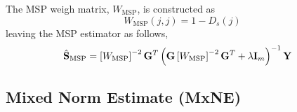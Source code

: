 The MSP weigh matrix, $W_\text{MSP}$, is constructed as
\begin{equation}
W_\text{MSP}(j,j) = 1-{D}_s(j)
\end{equation}
leaving the MSP estimator as follows,
\begin{align}
\hat{\mathbf{S}}_\text{MSP} &=
\left[ W_\text{MSP} \right]^{-2} \mathbf{G}^T \left(  \mathbf{G}\left[ W_\text{MSP} \right]^{-2}\mathbf{G}^T + \lambda \mathbf{I}_m   \right)^{-1} \mathbf{Y}
\label{est:MSP}
\end{align}

\subsection{Mixed Norm Estimate (MxNE)}

